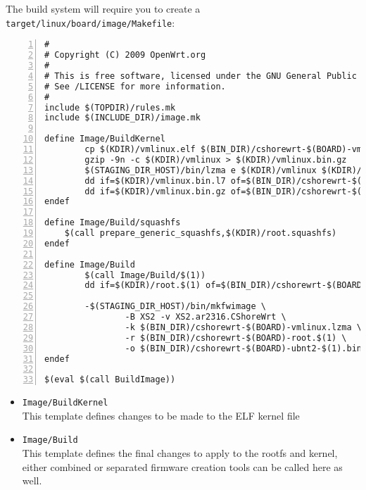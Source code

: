 The build system will require you to create a \texttt{target/linux/board/image/Makefile}:

\begin{Verbatim}[frame=single,numbers=left]
#
# Copyright (C) 2009 OpenWrt.org
#
# This is free software, licensed under the GNU General Public License v2.
# See /LICENSE for more information.
#
include $(TOPDIR)/rules.mk
include $(INCLUDE_DIR)/image.mk

define Image/BuildKernel
        cp $(KDIR)/vmlinux.elf $(BIN_DIR)/cshorewrt-$(BOARD)-vmlinux.elf
        gzip -9n -c $(KDIR)/vmlinux > $(KDIR)/vmlinux.bin.gz
        $(STAGING_DIR_HOST)/bin/lzma e $(KDIR)/vmlinux $(KDIR)/vmlinux.bin.l7
        dd if=$(KDIR)/vmlinux.bin.l7 of=$(BIN_DIR)/cshorewrt-$(BOARD)-vmlinux.lzma bs=65536 conv=sync
        dd if=$(KDIR)/vmlinux.bin.gz of=$(BIN_DIR)/cshorewrt-$(BOARD)-vmlinux.gz bs=65536 conv=sync
endef

define Image/Build/squashfs
    $(call prepare_generic_squashfs,$(KDIR)/root.squashfs)
endef

define Image/Build
        $(call Image/Build/$(1))
        dd if=$(KDIR)/root.$(1) of=$(BIN_DIR)/cshorewrt-$(BOARD)-root.$(1) bs=128k conv=sync

        -$(STAGING_DIR_HOST)/bin/mkfwimage \
                -B XS2 -v XS2.ar2316.CShoreWrt \
                -k $(BIN_DIR)/cshorewrt-$(BOARD)-vmlinux.lzma \
                -r $(BIN_DIR)/cshorewrt-$(BOARD)-root.$(1) \
                -o $(BIN_DIR)/cshorewrt-$(BOARD)-ubnt2-$(1).bin
endef

$(eval $(call BuildImage))

\end{Verbatim}

\begin{itemize}
    \item \texttt{Image/BuildKernel} \\
        This template defines changes to be made to the ELF kernel file
    \item \texttt{Image/Build} \\
	This template defines the final changes to apply to the rootfs and kernel, either combined or separated
	firmware creation tools can be called here as well.
\end{itemize}
